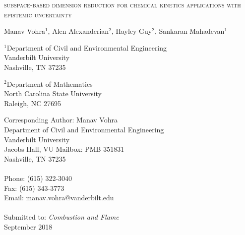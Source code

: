 \begin{center}
\textsc{ subspace-based dimension reduction for chemical kinetics applications with epistemic uncertainty}

\bigskip 
\bigskip 

Manav Vohra$^{1}$, Alen Alexanderian$^{2}$, Hayley Guy$^{2}$, Sankaran Mahadevan$^{1}$

\bigskip
\bigskip

\normalsize
$^1$Department of Civil and Environmental Engineering\\
Vanderbilt University\\
Nashville, TN 37235\\

\bigskip

$^2$Department of Mathematics\\
North Carolina State University\\
Raleigh, NC 27695\\

\bigskip

\end{center}

\vspace{6cm}

\begin{tabbing}
Corresponding Author: \hspace{5mm} \= Manav Vohra\\
       \>  Department of Civil and Environmental Engineering\\
       \>  Vanderbilt University\\
        Jacobs Hall, VU Mailbox: PMB 351831 \\
       \>  Nashville, TN 37235 \\
       \> \\
Phone: \> (615) 322-3040 \\
Fax:   \> (615) 343-3773 \\
Email: \>  manav.vohra@vanderbilt.edu   \\
\\
Submitted to: \> \textit{Combustion and Flame} \\
\>  September 2018\\

\bigskip
\end{tabbing}

\clearpage

